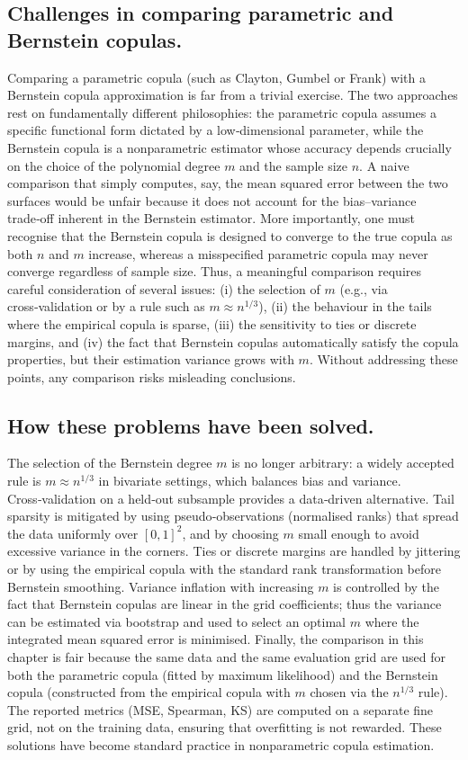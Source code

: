 \subsection{Challenges in comparing parametric and Bernstein copulas.}
Comparing a parametric copula (such as Clayton, Gumbel or Frank) with a Bernstein copula approximation is far from a trivial exercise. The two approaches rest on fundamentally different philosophies: the parametric copula assumes a specific functional form dictated by a low‑dimensional parameter, while the Bernstein copula is a nonparametric estimator whose accuracy depends crucially on the choice of the polynomial degree \(m\) and the sample size \(n\). A naive comparison that simply computes, say, the mean squared error between the two surfaces would be unfair because it does not account for the bias–variance trade‑off inherent in the Bernstein estimator. More importantly, one must recognise that the Bernstein copula is designed to converge to the true copula as both \(n\) and \(m\) increase, whereas a misspecified parametric copula may never converge regardless of sample size. Thus, a meaningful comparison requires careful consideration of several issues: (i) the selection of \(m\) (e.g., via cross‑validation or by a rule such as \(m \approx n^{1/3}\)), (ii) the behaviour in the tails where the empirical copula is sparse, (iii) the sensitivity to ties or discrete margins, and (iv) the fact that Bernstein copulas automatically satisfy the copula properties, but their estimation variance grows with \(m\). Without addressing these points, any comparison risks misleading conclusions.

\subsection{How these problems have been solved.}
The selection of the Bernstein degree \(m\) is no longer arbitrary: a widely accepted rule is \(m \approx n^{1/3}\) in bivariate settings, which balances bias and variance. Cross‑validation on a held‑out subsample provides a data‑driven alternative. Tail sparsity is mitigated by using pseudo‑observations (normalised ranks) that spread the data uniformly over \([0,1]^2\), and by choosing \(m\) small enough to avoid excessive variance in the corners. Ties or discrete margins are handled by jittering or by using the empirical copula with the standard rank transformation before Bernstein smoothing. Variance inflation with increasing \(m\) is controlled by the fact that Bernstein copulas are linear in the grid coefficients; thus the variance can be estimated via bootstrap and used to select an optimal \(m\) where the integrated mean squared error is minimised. Finally, the comparison in this chapter is fair because the same data and the same evaluation grid are used for both the parametric copula (fitted by maximum likelihood) and the Bernstein copula (constructed from the empirical copula with \(m\) chosen via the \(n^{1/3}\) rule). The reported metrics (MSE, Spearman, KS) are computed on a separate fine grid, not on the training data, ensuring that overfitting is not rewarded. These solutions have become standard practice in nonparametric copula estimation.


